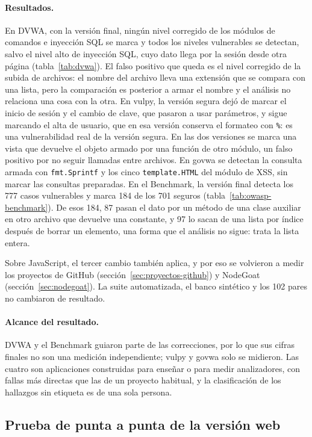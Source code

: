 \paragraph{Resultados.} En DVWA, con la versión final, ningún nivel
corregido de los módulos de comandos e inyección SQL se marca y todos los
niveles vulnerables se detectan, salvo el nivel alto de inyección SQL,
cuyo dato llega por la sesión desde otra página
(tabla~\ref{tab:dvwa}). El falso positivo que queda es el nivel corregido
de la subida de archivos: el nombre del archivo lleva una extensión que
se compara con una lista, pero la comparación es posterior a armar el
nombre y el análisis no relaciona una cosa con la otra. En vulpy, la
versión segura dejó de marcar el inicio de sesión y el cambio de clave,
que pasaron a usar parámetros, y sigue marcando el alta de usuario, que
en esa versión conserva el formateo con \texttt{\%}: es una
vulnerabilidad real de la versión segura. En las dos versiones se marca
una vista que devuelve el objeto armado por una función de otro módulo,
un falso positivo por no seguir llamadas entre archivos. En govwa se
detectan la consulta armada con \texttt{fmt.Sprintf} y los cinco
\texttt{template.HTML} del módulo de XSS, sin marcar las consultas
preparadas. En el Benchmark, la versión final detecta los 777 casos
vulnerables y marca 184 de los 701 seguros (tabla~\ref{tab:owasp-benchmark}).
De esos 184, 87 pasan el dato por un método de una clase auxiliar en otro
archivo que devuelve una constante, y 97 lo sacan de una lista por
índice después de borrar un elemento, una forma que el análisis no
sigue: trata la lista entera.

Sobre JavaScript, el tercer cambio también aplica, y por eso se volvieron
a medir los proyectos de GitHub (sección~\ref{sec:proyectos-github}) y
NodeGoat (sección~\ref{sec:nodegoat}). La suite automatizada, el banco
sintético y los 102 pares no cambiaron de resultado.

\paragraph{Alcance del resultado.} DVWA y el Benchmark guiaron parte de
las correcciones, por lo que sus cifras finales no son una medición
independiente; vulpy y govwa solo se midieron. Las cuatro son
aplicaciones construidas para enseñar o para medir analizadores, con
fallas más directas que las de un proyecto habitual, y la clasificación
de los hallazgos sin etiqueta es de una sola persona.

\subsection{Prueba de punta a punta de la versión web}\label{sec:prueba-web}

